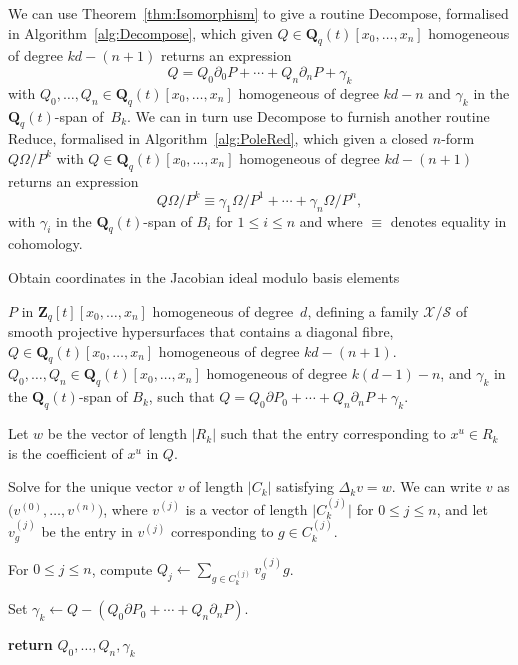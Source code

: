 \documentclass[a4paper,11pt]{article}
\numberwithin{equation}{section}
\providecommand{\abs}[1]{\lvert#1\rvert}                 %
\newcommand{\ZZ}{\mathbf{Z}} %
\newcommand{\QQ}{\mathbf{Q}} %
\theoremstyle{definition}
\begin{document}
We can use Theorem~\ref{thm:Isomorphism} to give a routine {\sc Decompose}, 
formalised in Algorithm~\ref{alg:Decompose}, which given 
$Q \in \QQ_q(t)[x_0, \dotsc, x_n]$ homogeneous of degree $kd - (n+1)$
returns an expression 
\begin{equation*}
Q = Q_0 \partial_0 P + \dotsb + Q_n \partial_n P + \gamma_k
\end{equation*} 
with $Q_0, \dotsc, Q_n \in \QQ_q(t)[x_0, \dotsc, x_n]$ homogeneous of 
degree $kd-n$ and $\gamma_k$ in the $\QQ_q(t)$-span of~$B_k$. We can in turn 
use {\sc Decompose} to furnish another routine {\sc Reduce}, formalised 
in Algorithm~\ref{alg:PoleRed}, which given a closed $n$-form $Q\Omega/P^k$ 
with $Q \in \QQ_q(t)[x_0, \dotsc, x_n]$ homogeneous of degree $kd - (n+1)$ returns 
an expression
\begin{equation*}
Q \Omega / P^k \equiv \gamma_{1} \Omega / P^{1} + \dotsb + \gamma_n \Omega / P^n,
\end{equation*}
with $\gamma_i$ in the $\QQ_q(t)$-span of $B_i$ for $1 \leq i \leq n$ and 
where $\equiv$ denotes equality in cohomology.


\begin{algorithm}
\caption{Obtain coordinates in the Jacobian ideal modulo basis elements}
\label{alg:Decompose}
\begin{algorithmic}
\Require $P$ in $\ZZ_q[t][x_0, \dotsc, x_n]$ homogeneous of degree~$d$, 
         defining a family $\mathcal{X}/\mathcal{S}$ of smooth projective 
         hypersurfaces that contains a diagonal fibre, 
         $Q \in \QQ_q(t)[x_0, \dotsc, x_n]$ homogeneous of degree $kd - (n+1)$.
\Ensure  $Q_0, \dotsc, Q_n \in \QQ_q(t)[x_0, \dotsc, x_n]$ homogeneous of degree 
         $k(d-1)-n$, and $\gamma_k$ in the $\QQ_q(t)$-span of $B_k$, such that 
         $Q = Q_0 \partial P_0 + \dotsb + Q_n \partial_n P +\gamma_k$.
\State \begin{compactenum}[{\hspace{1em}} 1.] \vspace{-1.24em}
\item Let $w$ be the vector of length $\abs{R_k}$ such that the entry 
      corresponding to $x^u \in R_k$ is the coefficient of 
      $x^u$ in $Q$.
\item Solve for the unique vector $v$ of length $\abs{C_k}$ satisfying 
      $\Delta_k v = w$.  We can write $v$ 
      as $\bigl(v^{(0)}, \dotsc, v^{(n)}\bigr)$, where $v^{(j)}$ is 
      a vector of length $\abs{C_k^{(j)}}$ for $0 \leq j \leq n$,
      and let $v_g^{(j)}$ be the entry in $v^{(j)}$ corresponding 
      to $g \in C_k^{(j)}$.
\item For $0 \leq j \leq n$, compute $Q_j \gets \sum_{g \in C_k^{(j)}} v_g^{(j)} g$.
\item Set $\gamma_k \gets Q-(Q_0 \partial P_0 + \dotsb + Q_n \partial_n P)$.
\item \textbf{return} $Q_0, \dotsc, Q_n,\gamma_k$      
\EndProcedure
\end{compactenum}
\end{algorithmic}
\end{algorithm}
\end{document}
